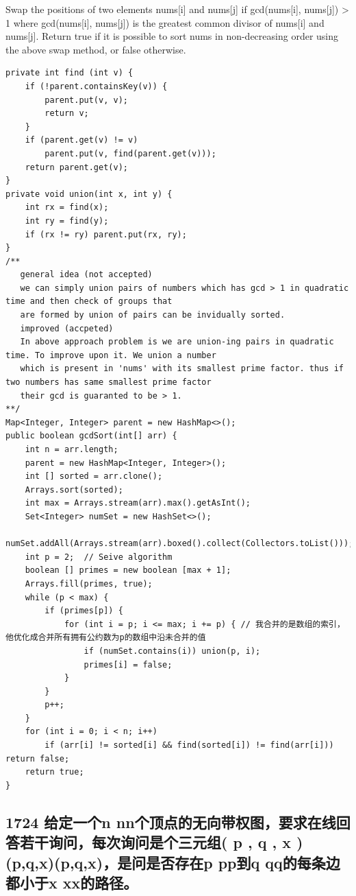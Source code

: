 \documentclass[9pt, b5paaper]{book}
\begin{document}
Swap the positions of two elements nums[i] and nums[j] if gcd(nums[i], nums[j]) > 1 where gcd(nums[i], nums[j]) is the greatest common divisor of nums[i] and nums[j].
Return true if it is possible to sort nums in non-decreasing order using the above swap method, or false otherwise.
\begin{verbatim}
private int find (int v) {
    if (!parent.containsKey(v)) {
        parent.put(v, v);
        return v;
    }
    if (parent.get(v) != v)
        parent.put(v, find(parent.get(v)));
    return parent.get(v);
}
private void union(int x, int y) {
    int rx = find(x);
    int ry = find(y);
    if (rx != ry) parent.put(rx, ry);
}
/**
   general idea (not accepted)
   we can simply union pairs of numbers which has gcd > 1 in quadratic time and then check of groups that
   are formed by union of pairs can be invidually sorted. 
   improved (accpeted)
   In above approach problem is we are union-ing pairs in quadratic time. To improve upon it. We union a number
   which is present in 'nums' with its smallest prime factor. thus if two numbers has same smallest prime factor
   their gcd is guaranted to be > 1. 
**/
Map<Integer, Integer> parent = new HashMap<>();
public boolean gcdSort(int[] arr) {
    int n = arr.length;
    parent = new HashMap<Integer, Integer>();
    int [] sorted = arr.clone();
    Arrays.sort(sorted);
    int max = Arrays.stream(arr).max().getAsInt();
    Set<Integer> numSet = new HashSet<>();
    numSet.addAll(Arrays.stream(arr).boxed().collect(Collectors.toList()));
    int p = 2;  // Seive algorithm
    boolean [] primes = new boolean [max + 1];
    Arrays.fill(primes, true);
    while (p < max) {
        if (primes[p]) {
            for (int i = p; i <= max; i += p) { // 我合并的是数组的索引，他优化成合并所有拥有公约数为p的数组中沿未合并的值
                if (numSet.contains(i)) union(p, i);
                primes[i] = false;
            }
        }
        p++;
    }
    for (int i = 0; i < n; i++) 
        if (arr[i] != sorted[i] && find(sorted[i]) != find(arr[i])) return false;
    return true;
}
\end{verbatim}

\subsection{1724 给定一个n nn个顶点的无向带权图，要求在线回答若干询问，每次询问是个三元组( p , q , x ) (p,q,x)(p,q,x)，是问是否存在p pp到q qq的每条边都小于x xx的路径。}
\label{sec-10-0-7}
\end{document}
